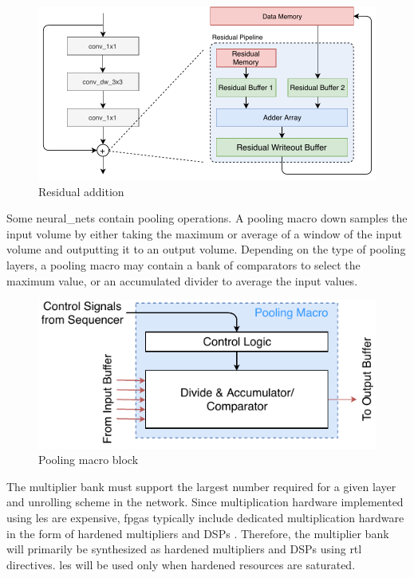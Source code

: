 \documentclass{uw-ece-wkrpt}
\begin{document}
\begin{figure}
\centering
\includegraphics[width=\textwidth]{figures/residual_addition}
\caption{Residual addition}\label{fig:residual_addition}
\end{figure}

Some \glspl{neural_net} contain pooling operations. A pooling macro down samples the input volume by either taking the maximum or average of a window of the input volume and outputting it to an output volume. Depending on the type of pooling layers, a pooling macro may contain a bank of comparators to select the maximum value, or an accumulated divider to average the input values.

\begin{figure}
\centering
\includegraphics{figures/pooling_macro}
\caption{Pooling macro block \cite{Ma2017An-automatic-RT}}\label{fig:pooling_macro}
\end{figure}

The multiplier bank must support the largest number required for a given layer and unrolling scheme in the network. Since multiplication hardware implemented using \glspl{le} are expensive, \glspl{fpga} typically include dedicated multiplication hardware in the form of hardened multipliers and DSPs \cite{Intel-Corp.2018IntelR-ArriaR-1}. Therefore, the multiplier bank will primarily be synthesized as hardened multipliers and DSPs using \gls{rtl} directives. \Glspl{le} will be used only when hardened resources are saturated.
\end{document}
